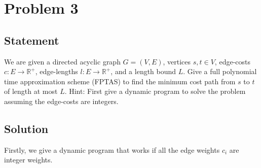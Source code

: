 \documentclass[a4paper]{article}
\newcommand{\R}{\mathbb{R}}
\begin{document}
\newpage

\section{Problem 3}

\subsection{Statement}

We are given a directed acyclic graph $G = (V, E)$, vertices $s, t \in V$, edge-costs $c : E \to \R^+$, edge-lengths $l : E \to \R^+$, and a length bound $L$. Give a full polynomial time approximation
scheme (FPTAS) to find the minimum cost path from $s$ to $t$ of length at most $L$.  Hint: First give a dynamic program to solve the problem assuming the edge-costs are integers.

\subsection{Solution}

Firstly, we give a dynamic program that works if all the edge weights $c_i$ are integer weights.
\end{document}
